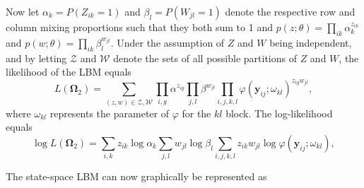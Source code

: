 \documentclass[10pt,a4paper]{article}
\begin{document}
Now let $\alpha_k = P(Z_{ik} = 1)$ and $\beta_l = P(W_{jl} = 1)$ denote the respective row and column mixing proportions such that they both sum to 1 and 
%
$
p(z; \theta) = \prod_{ik} \alpha_k^{z_{ik}} 
$
%
and 
%
$
p(w; \theta) = \prod_{ik} \beta_l^{w_{jl}}. 
$ 
%
Under the assumption of $Z$ and $W$ being independent, and by letting $\mathcal{Z}$ and $\mathcal{W}$ denote the sets of all possible partitions of $Z$ and $W$, the likelihood of the LBM equals
$$
L(\boldsymbol{\Omega}_2) = \sum_{(z, w) \in \mathcal{Z}, \mathcal{W}} \prod_{i, g} \alpha^{z_{ig}} \prod_{j, l} \beta^{w_{jl}} \prod_{i, j, k, l} \varphi(\mathbf{y}_{ij}; \omega_{kl})^{z_{ig} w_{jl}},
$$
%
where $\omega_{kl}$ represents the parameter of $\varphi$ for the $kl$ block. The log-likelihood equals 
%
$$
\log L(\boldsymbol{\Omega}_2) = \sum_{i, k} z_{ik} \log\alpha_k \sum_{j, l} w_{jl} \log \beta_l \sum_{i, j, k, l} z_{ik} w_{jl} \log\varphi(\mathbf{y}_{ij}; \omega_{kl}),
$$
%

The state-space LBM can now graphically be represented as

\begin{figure}[H]
	\centering
\end{figure}	
\end{document}
